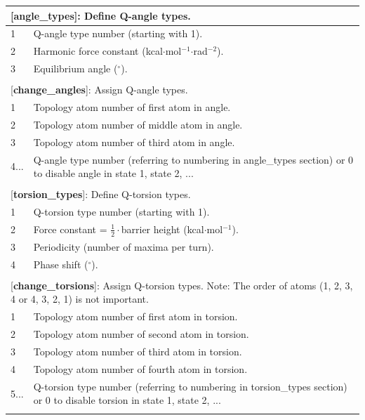 \documentclass[a4paper,12pt]{article}
\begin{document}
\begin{longtable}{|p{53pt}|p{181pt}|p{160pt}|}
\multicolumn{3}{p{394pt}}{[\textbf{angle\_types}]: Define Q-angle types.}\\
\hline 1 & \multicolumn{2}{p{341pt}|}{Q-angle type number (starting with 1).}\\
\hline 2 & \multicolumn{2}{p{341pt}|}{Harmonic force constant (kcal$\cdot$mol$^{-1}$$\cdot$rad$^{-2}$).}\\
\hline 3 & \multicolumn{2}{p{341pt}|}{Equilibrium angle ($^{\circ}$).}\\
\hline
\multicolumn{3}{p{394pt}}{}\\

\multicolumn{3}{p{394pt}}{[\textbf{change\_angles}]: Assign Q-angle types.}\\
\hline 1 & \multicolumn{2}{p{341pt}|}{Topology atom number of first atom in angle.}\\
\hline 2 & \multicolumn{2}{p{341pt}|}{Topology atom number of middle atom in angle.}\\
\hline 3 & \multicolumn{2}{p{341pt}|}{Topology atom number of third atom in angle.}\\
\hline 4... & \multicolumn{2}{p{341pt}|}{Q-angle type number (referring to numbering in angle\_types section) or 0 to disable angle in state 1, state 2, ...}\\
\hline
\multicolumn{3}{p{394pt}}{}\\

\multicolumn{3}{p{394pt}}{[\textbf{torsion\_types}]: Define Q-torsion types.}\\
\hline 1 & \multicolumn{2}{p{341pt}|}{Q-torsion type number (starting with 1).}\\
\hline 2 & \multicolumn{2}{p{341pt}|}{Force constant = $\frac{1}{2}\cdot$barrier height (kcal$\cdot$mol$^{-1}$).}\\
\hline 3 & \multicolumn{2}{p{341pt}|}{Periodicity (number of maxima per turn).}\\
\hline 4 & \multicolumn{2}{p{341pt}|}{Phase shift ($^{\circ}$).}\\
\hline
\multicolumn{3}{p{394pt}}{}\\

\multicolumn{3}{p{394pt}}{[\textbf{change\_torsions}]: Assign Q-torsion types. Note: The order of atoms (1, 2, 3, 4 or 4, 3, 2, 1) is not important.}\\
\hline 1 & \multicolumn{2}{p{341pt}|}{Topology atom number of first atom in torsion.}\\
\hline 2 & \multicolumn{2}{p{341pt}|}{Topology atom number of second atom in torsion.}\\
\hline 3 & \multicolumn{2}{p{341pt}|}{Topology atom number of third atom in torsion.}\\
\hline 4 & \multicolumn{2}{p{341pt}|}{Topology atom number of fourth atom in torsion.}\\
\hline 5... & \multicolumn{2}{p{341pt}|}{Q-torsion type number (referring to numbering in torsion\_types section) or 0 to disable torsion in state 1, state 2, ...}\\
\hline
\multicolumn{3}{p{394pt}}{}\\


\end{longtable}
\end{document}
